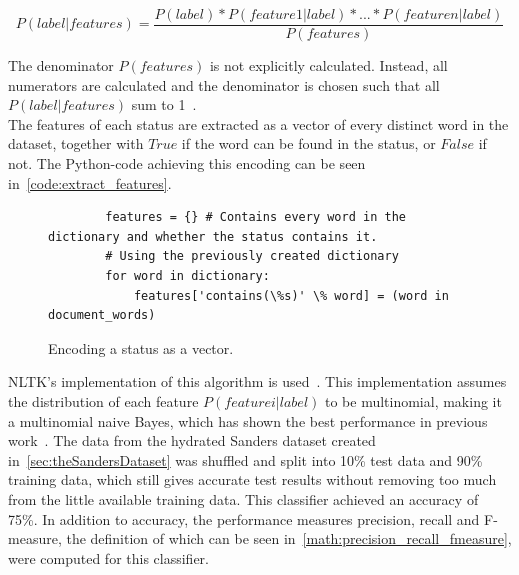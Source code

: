 \begin{equation}
    P(label|features) = \frac{P(label)*P(feature 1|label)*...*P(feature n|label)}{P(features)}
\end{equation}


The denominator $P(features)$ is not explicitly calculated.
Instead, all numerators are calculated and the denominator is chosen such that all $P(label|features)$ sum to 1~\cite{nltkDocs}.
\\
The features of each status are extracted as a vector of every distinct word in the dataset,
together with $True$ if the word can be found in the status, or $False$ if not.
The Python-code achieving this encoding can be seen in~\autoref{code:extract_features}.

\begin{figure}
    \caption{Encoding a status as a vector.}
    \label{code:extract_features}
    \begin{verbatim}
        features = {} # Contains every word in the dictionary and whether the status contains it.
        # Using the previously created dictionary
        for word in dictionary:
            features['contains(\%s)' \% word] = (word in document_words)
    \end{verbatim}
\end{figure}

NLTK's implementation of this algorithm is used~\cite{nltkDocs}.
This implementation assumes the distribution of each feature $P(feature i|label)$ to be multinomial,
making it a multinomial naive Bayes, which has shown the best performance in previous work~\cite{Go2009}.
The data from the hydrated Sanders dataset created in~\autoref{sec:theSandersDataset} was shuffled and split into 10\% test data and 90\% training data,
which still gives accurate test results without removing too much from the little available training data.
This classifier achieved an accuracy of 75\%.
In addition to accuracy, the performance measures precision, recall and F-measure,
the definition of which can be seen in~\autoref{math:precision_recall_fmeasure}, were computed for this classifier.

